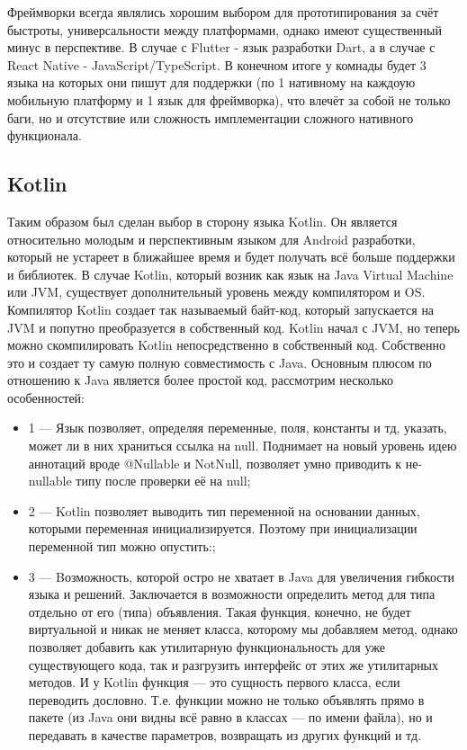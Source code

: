 Фреймворки всегда являлись хорошим выбором для прототипирования за счёт быстроты, универсальности между платформами, однако имеют существенный минус в перспективе. В случае с Flutter - язык разработки Dart, а в случае с React Native - JavaScript/TypeScript. В конечном итоге у комнады будет 3 языка на которых они пишут для поддержки (по 1 нативному на каждоую мобильную платформу и 1 язык для фреймворка), что влечёт за собой не только баги, но и отсутствие или сложность имплементации сложного нативного функционала.

\subsection{Kotlin}
Таким образом был сделан выбор в сторону языка Kotlin. Он является относительно молодым и перспективным языком для Android разработки, который не устареет в ближайшее время и будет получать всё больше поддержки и библиотек. В случае Kotlin, который возник как язык на Java Virtual Machine или JVM, существует дополнительный уровень между компилятором и OS. Компилятор Kotlin создает так называемый байт-код, который запускается на JVM и попутно преобразуется в собственный код. Kotlin начал с JVM, но теперь можно скомпилировать Kotlin непосредственно в собственный код. Собственно это и создает ту самую полную совместимость с Java. Основным плюсом по отношению к Java является более простой код, рассмотрим несколько особенностей:

\begin{itemize}
 \item 1 — Язык позволяет, определяя переменные, поля, константы и тд, указать, может ли в них храниться ссылка на null. Поднимает на новый уровень идею аннотаций вроде @Nullable и NotNull, позволяет умно приводить к не-nullable типу после проверки её на null;
 \item 2 — Kotlin позволяет выводить тип переменной на основании данных, которыми переменная инициализируется. Поэтому при инициализации переменной тип можно опустить:;
 \item 3 — Bозможность, которой остро не хватает в Java для увеличения гибкости языка и решений. Заключается в возможности определить метод для типа отдельно от его (типа) объявления. Такая функция, конечно, не будет виртуальной и никак не меняет класса, которому мы добавляем метод, однако позволяет добавить как утилитарную функциональность для уже существующего кода, так и разгрузить интерфейс от этих же утилитарных методов. И у Kotlin функция — это сущность первого класса, если переводить дословно. Т.е. функции можно не только объявлять прямо в пакете (из Java они видны всё равно в классах — по имени файла), но и передавать в качестве параметров, возвращать из других функций и тд.
\end{itemize}
 

